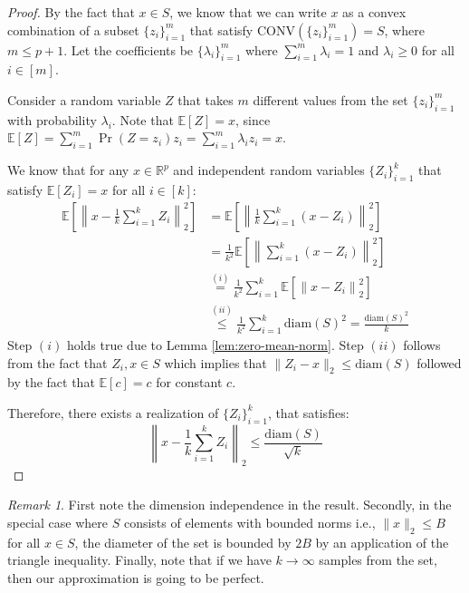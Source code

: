 \documentclass{article}
\theoremstyle{remark}
\newtheorem*{remark}{Remark}
\newcommand{\real}{\mathbb{R}}
\newcommand{\Exp}{\mathbb{E}}
\begin{document}
\begin{proof}
By the fact that \(x \in S\), we know that we can write \(x\) as a convex combination of a subset \(\{z_{i}\}_{i=1}^{m}\) that satisfy \(\mathrm{CONV}(\{z_{i}\}_{i=1}^{m}) = S\), where \(m \leq p + 1\). Let the coefficients be \(\{\lambda_{i}\}_{i=1}^{m}\) where \(\sum\limits_{i=1}^{m} \lambda_{i} = 1\) and \(\lambda_{i} \geq 0\) for all \(i \in [m]\).

Consider a random variable \(Z\) that takes \(m\) different values from the set \(\{z_{i}\}_{i=1}^{m}\) with probability \(\lambda_{i}\). Note that \(\Exp[Z] = x\), since \(\Exp[Z] = \sum\limits_{i=1}^{m} \Pr(Z = z_{i})z_{i} = \sum\limits_{i=1}^{m} \lambda_{i}z_{i} = x\).

We know that for any \(x \in \real^{p}\) and independent random variables \(\{Z_{i}\}_{i=1}^{k}\) that satisfy \(\Exp[Z_{i}] = x\) for all \(i \in [k]\):
\begin{align*}
\Exp\left[\left\|x - \frac{1}{k}\sum_{i=1}^{k}Z_{i}\right\|_{2}^{2}\right] &= \Exp\left[\left\|\frac{1}{k}\sum_{i=1}^{k}(x - Z_{i})\right\|_{2}^{2}\right] \\
&= \frac{1}{k^{2}}\Exp\left[\left\|\sum_{i=1}^{k} (x - Z_{i})\right\|_{2}^{2}\right] \\
&\overset{(i)}= \frac{1}{k^{2}}\sum_{i=1}^{k}\Exp\left[\left\|x - Z_{i}\right\|_{2}^{2}\right] \\
&\overset{(ii)}\leq \frac{1}{k^{2}}\sum_{i=1}^{k}\mathrm{diam}(S)^{2} = \frac{\mathrm{diam}(S)^{2}}{k}
\end{align*}
Step \((i)\) holds true due to Lemma \ref{lem:zero-mean-norm}. Step \((ii)\) follows from the fact that \(Z_{i}, x \in S\) which implies that \(\|Z_{i} - x\|_{2} \leq \mathrm{diam}(S)\) followed by the fact that \(\Exp[c] = c\) for constant \(c\).

Therefore, there exists a realization of \(\{Z_{i}\}_{i=1}^{k}\), that satisfies:
\begin{equation*}
\left\|x - \frac{1}{k}\sum_{i=1}^{k}Z_{i}\right\|_{2} \leq \frac{\mathrm{diam}(S)}{\sqrt{k}}
\end{equation*}
\end{proof}

\begin{remark}
First note the dimension independence in the result. Secondly, in the special case where \(S\) consists of elements with bounded norms i.e., \(\|x\|_{2} \leq B\) for all \(x \in S\), the diameter of the set is bounded by \(2B\) by an application of the triangle inequality. Finally, note that if we have \(k \to \infty\) samples from the set, then our approximation is going to be perfect.
\end{remark}
\end{document}
